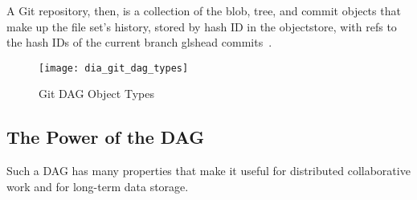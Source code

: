 A Git \gls{repository}, then, is a collection of the \gls{blob}, \gls{tree}, and
\gls{commit} objects that make up the file set's history, stored by hash ID in
the \gls{objectstore}, with \glspl{ref} to the hash IDs of the current
\gls{branch} gls{head} \glspl{commit}~\cite{git_initial_readme}.

\begin{figure}[]
    \centering
        \texttt{[image: dia\_git\_dag\_types]}
    \caption{Git DAG Object Types}
    \label{dia_git_dag_types}
\end{figure}


%

\subsection{The Power of the DAG}

Such a \gls{DAG} has many properties that make it useful for distributed
collaborative work and for long-term data storage.

